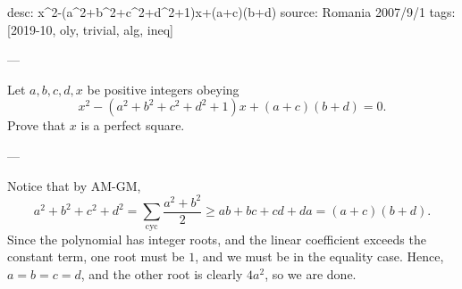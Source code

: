 desc: x^2-(a^2+b^2+c^2+d^2+1)x+(a+c)(b+d)
source: Romania 2007/9/1
tags: [2019-10, oly, trivial, alg, ineq]

---

Let $a,b,c,d,x$ be positive integers obeying \[x^2-\left(a^2+b^2+c^2+d^2+1\right)x+(a+c)(b+d)=0.\]
Prove that $x$ is a perfect square.

---

Notice that by AM-GM, \[a^2+b^2+c^2+d^2=\sum_\mathrm{cyc}\frac{a^2+b^2}2\ge ab+bc+cd+da=(a+c)(b+d).\]
Since the polynomial has integer roots, and the linear coefficient exceeds the constant term, one root must be $1$, and we must be in the equality case. Hence, $a=b=c=d$, and the other root is clearly $4a^2$, so we are done.
